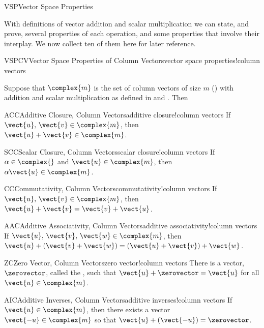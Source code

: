 \begin{subsect}{VSP}{Vector Space Properties}
%
\begin{para}With definitions of vector addition and scalar multiplication we can state, and prove, several properties of each operation, and some properties that involve their interplay.  We now collect ten of them here for later reference.\end{para}
%
\begin{theorem}{VSPCV}{Vector Space Properties of Column Vectors}{vector space properties!column vectors}
\begin{para}Suppose that $\complex{m}$ is the set of column vectors of size $m$ () with addition and scalar multiplication as defined in  and .  Then
%
\begin{propertylist}
%
\begin{property}{ACC}{Additive Closure, Column Vectors}{additive closure!column vectors}
If $\vect{u},\,\vect{v}\in\complex{m}$, then $\vect{u}+\vect{v}\in\complex{m}$.\end{property}
%
\begin{property}{SCC}{Scalar Closure, Column Vectors}{scalar closure!column vectors}
If $\alpha\in\complex{\null}$ and $\vect{u}\in\complex{m}$, then $\alpha\vect{u}\in\complex{m}$.\end{property}
%
\begin{property}{CC}{Commutativity, Column Vectors}{commutativity!column vectors}
If $\vect{u},\,\vect{v}\in\complex{m}$, then $\vect{u}+\vect{v}=\vect{v}+\vect{u}$.\end{property}
%
\begin{property}{AAC}{Additive Associativity, Column Vectors}{additive associativity!column vectors}
If $\vect{u},\,\vect{v},\,\vect{w}\in\complex{m}$, then $\vect{u}+\left(\vect{v}+\vect{w}\right)=\left(\vect{u}+\vect{v}\right)+\vect{w}$.\end{property}
%
\begin{property}{ZC}{Zero Vector, Column Vectors}{zero vector!column vectors}
There is a vector, $\zerovector$, called the , such that  $\vect{u}+\zerovector=\vect{u}$  for all $\vect{u}\in\complex{m}$.\end{property}
%
\begin{property}{AIC}{Additive Inverses, Column Vectors}{additive inverses!column vectors}
If  $\vect{u}\in\complex{m}$, then there exists a vector $\vect{-u}\in\complex{m}$ so that $\vect{u}+ (\vect{-u})=\zerovector$.\end{property}

\end{propertylist}
\end{para}
\end{theorem}
\end{subsect}
